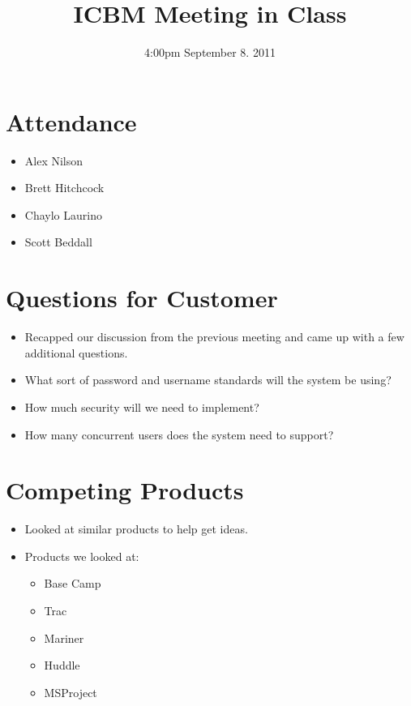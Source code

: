 \documentclass{article}
\begin{document}
\title{ICBM Meeting in Class}
\date{4:00pm September 8. 2011}
\maketitle

\section{Attendance}
\begin{itemize}
\item Alex Nilson
\item Brett Hitchcock
\item Chaylo Laurino
\item Scott Beddall
\end{itemize}

\section{Questions for Customer}
\begin{itemize}
\item Recapped our discussion from the previous meeting and came up with a few additional questions.
\item What sort of password and username standards will the system be using?
\item How much security will we need to implement?
\item How many concurrent users does the system need to support?
\end{itemize}

\section{Competing Products}
\begin{itemize}
\item Looked at similar products to help get ideas.
\item Products we looked at:
	\begin{itemize}
	\item Base Camp
	\item Trac
	\item Mariner
	\item Huddle
	\item MSProject
	\end{itemize}
\end{itemize}
\end{document}

